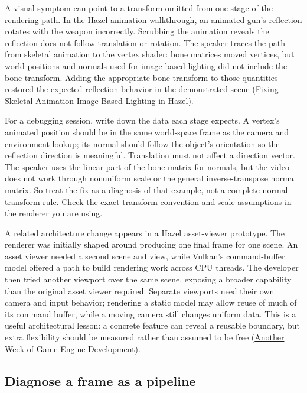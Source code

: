 A visual symptom can point to a transform omitted from one stage of the rendering path. In the Hazel animation walkthrough, an animated gun's reflection rotates with the weapon incorrectly. Scrubbing the animation reveals the reflection does not follow translation or rotation. The speaker traces the path from skeletal animation to the vertex shader: bone matrices moved vertices, but world positions and normals used for image-based lighting did not include the bone transform. Adding the appropriate bone transform to those quantities restored the expected reflection behavior in the demonstrated scene (\href{https://www.youtube.com/watch?v=fs9ChRr4VHM&t=4m18s}{Fixing Skeletal Animation Image-Based Lighting in Hazel}).

For a debugging session, write down the data each stage expects. A vertex's animated position should be in the same world-space frame as the camera and environment lookup; its normal should follow the object's orientation so the reflection direction is meaningful. Translation must not affect a direction vector. The speaker uses the linear part of the bone matrix for normals, but the video does not work through nonuniform scale or the general inverse-transpose normal matrix. So treat the fix as a diagnosis of that example, not a complete normal-transform rule. Check the exact transform convention and scale assumptions in the renderer you are using.

A related architecture change appears in a Hazel asset-viewer prototype. The renderer was initially shaped around producing one final frame for one scene. An asset viewer needed a second scene and view, while Vulkan's command-buffer model offered a path to build rendering work across CPU threads. The developer then tried another viewport over the same scene, exposing a broader capability than the original asset viewer required. Separate viewports need their own camera and input behavior; rendering a static model may allow reuse of much of its command buffer, while a moving camera still changes uniform data. This is a useful architectural lesson: a concrete feature can reveal a reusable boundary, but extra flexibility should be measured rather than assumed to be free (\href{https://www.youtube.com/watch?v=Dr6ly-PO9nM&t=2m12s}{Another Week of Game Engine Development}).

\subsection{Diagnose a frame as a pipeline}\label{06-engine-ii-ch026-diagnose-a-frame-as-a-pipeline}


